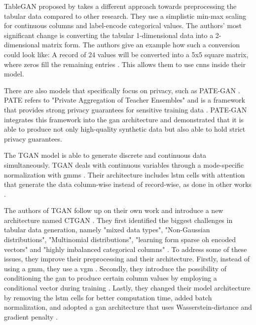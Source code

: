 TableGAN proposed by \textcite{park2018DataSynthesisBased} takes a different approach towards preprocessing the tabular data compared to other research.
They use a simplistic min-max scaling for continuous columns and label-encode categorical values.
The authors' most significant change is converting the tabular 1-dimensional data into a 2-dimensional matrix form.
The authors give an example how such a conversion could look like:
A record of 24 values will be converted into a 5x5 square matrix, where zeros fill the remaining entries \cite[p-4]{park2018DataSynthesisBased}.
This allows them to use \glspl{cnn} inside their \gls{model}.

There are also \glspl{model} that specifically focus on privacy, such as PATE-GAN  \cite{jordon2018PATEGANGeneratingSynthetic}.
PATE refers to "Private Aggregation of Teacher Ensembles" \cite{papernot2017SemisupervisedKnowledgeTransfer} and is a framework that provides strong privacy guarantees for sensitive training data \cite{jordon2018PATEGANGeneratingSynthetic}.
PATE-GAN integrates this framework into the \gls{gan} architecture and demonstrated that it is able to produce not only high-quality synthetic data but also able to hold strict privacy guarantees.

The TGAN \cite{xu2018SynthesizingTabularData} \gls{model} is able to generate discrete and continuous data simultaneously.
TGAN deals with continuous variables through a mode-specific normalization with \glspl{gmm} \cite[p. 3]{xu2018SynthesizingTabularData}.
Their architecture includes \gls{lstm} cells with attention that generate the data column-wise instead of record-wise, as done in other works \cite{xu2018SynthesizingTabularData}.

The authors of TGAN follow up on their own work and introduce a new architecture named CTGAN \cite{xu2019ModelingTabularData}.
They first identified the biggest challenges in tabular data generation, namely "mixed data types", "Non-Gaussian distributions", "Multinomial distributions", "learning form sparse \gls{oh} encoded vectors" and "highly imbalanced categorical columns" \cite[p. 3]{xu2019ModelingTabularData}.
To address some of these issues, they improve their preprocessing and their architecture.
Firstly, instead of using a \acrfull{gmm}, they use a \acrfull{vgm} \cite{xu2019ModelingTabularData}.
Secondly, they introduce the possibility of conditioning the \gls{gan} to produce certain column values by employing a conditional vector during training \cite{xu2019ModelingTabularData}.
Lastly, they changed their \gls{model} architecture by removing the \gls{lstm} cells for better computation time, added batch normalization, 
and adopted a \gls{gan} architecture that uses Wasserstein-distance and gradient penalty \cite{gulrajani2017ImprovedTrainingWasserstein}.

